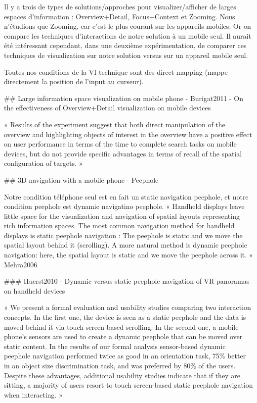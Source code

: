 Il y a trois de types de solutions/approches pour visualizer/afficher de larges espaces d'information : Overview+Detail, Focus+Context et Zooming. Nous n'étudions que Zooming, car c'est le plus courant sur les appareils mobiles. Or on compare les techniques d'interactions de notre solution à un mobile seul. Il aurait été intéressant cependant, dans une deuxième expérimentation, de comparer ces techniques de visualization sur notre solution versus sur un appareil mobile seul.

Toutes nos conditions de la VI technique sont des direct mapping (mappe directement la position de l'input au curseur).

## Large information space visualization on mobile phone - Burigat2011 - On the effectiveness of Overview+Detail visualization on mobile devices

« Results of the experiment suggest that both direct manipulation of the overview and highlighting objects of interest in the overview have a positive effect on user performance in terms of the time to complete search tasks on mobile devices, but do not provide specific advantages in terms of recall of the spatial configuration of targets. »

## 3D navigation with a mobile phone - Peephole

Notre condition téléphone seul est en fait un static navigation peephole, et notre condition peephole est dynamic navigatino peephole.
« Handheld displays leave little space for the visualization and navigation of spatial layouts representing rich information spaces. The most common navigation method for handheld displays is static peephole navigation : The peephole is static and we move the spatial layout behind it (scrolling). A more natural method is dynamic peephole navigation: here, the spatial layout is static and we move the peephole across it. » Mehra2006

### Huerst2010 - Dynamic versus static peephole navigation of VR panoramas on handheld devices

« We present a formal evaluation and usability studies comparing two interaction concepts. In the first one, the device is seen as a static peephole and the data is moved behind it via touch screen-based scrolling. In the second one, a mobile phone’s sensors are used to create a dynamic peephole that can be moved over static content. In the results of our formal analysis sensor-based dynamic peephole navigation performed twice as good in an orientation task, 75\% better in an object size discrimination task, and was preferred by 80\% of the users. Despite these advantages, additional usability studies indicate that if they are sitting, a majority of users resort to touch screen-based static peephole navigation when interacting. »

